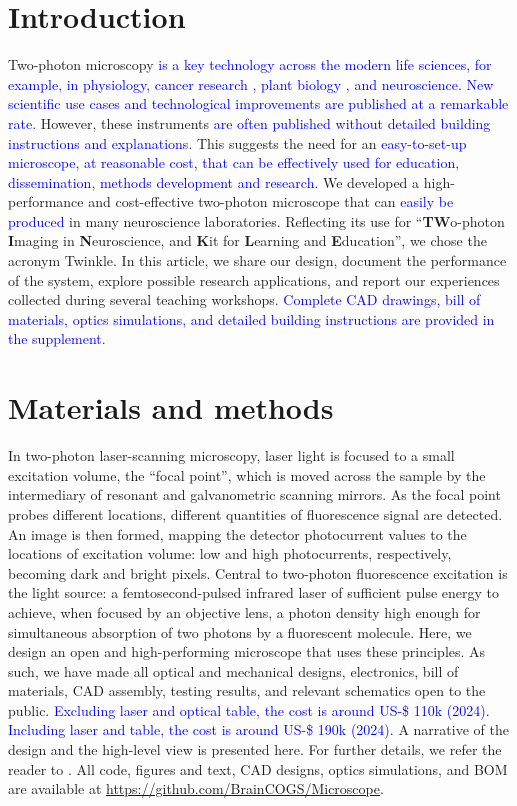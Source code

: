 \documentclass[10pt,letterpaper]{article}
\begin{document}
\linenumbers

\section*{Introduction}
%
Two-photon microscopy\cite{Denk1990, Svoboda1997} \textcolor{blue}{is a key technology across the modern life sciences\cite{Zipfel2003}, for example, in physiology\cite{Ueki2020, Dunn2002}, cancer research \cite{Perry2012}, plant biology \cite{Cheung2010}, and neuroscience\cite{So2000, Helmchen2005}. New scientific use cases and technological improvements are published at a remarkable rate\cite{Luu2024}.} However, these instruments \textcolor{blue}{are often published without detailed building instructions and explanations}. This suggests the need for an \textcolor{blue}{easy-to-set-up microscope, at reasonable cost, that can be effectively used for education, dissemination, methods development and research.} We developed a high-performance and cost-effective two-photon microscope that can \textcolor{blue}{easily be produced} in many neuroscience laboratories. Reflecting its use for ``\textbf{TW}o-photon \textbf{I}maging in \textbf{N}euroscience, and \textbf{K}it for \textbf{L}earning and \textbf{E}ducation'', we chose the acronym Twinkle. In this article, we share our design, document the performance of the system, explore possible research applications, and report our experiences collected during several teaching workshops. \textcolor{blue}{Complete CAD drawings, bill of materials, optics simulations, and detailed building instructions are provided in the supplement.}

\section*{Materials and methods}
In two-photon laser-scanning microscopy\cite{Denk1990}, laser light is focused to a small excitation volume,  the ``focal point'', which is moved across the sample by the intermediary of resonant and galvanometric scanning mirrors. As the focal point probes different locations, different quantities of fluorescence signal are detected.  An image is then formed, mapping the detector photocurrent values to the locations of excitation volume: low and high photocurrents, respectively, becoming dark and bright pixels. Central to two-photon fluorescence excitation is the light source: a femtosecond-pulsed infrared laser of sufficient pulse energy to achieve, when focused by an objective lens, a photon density high enough for simultaneous absorption of two photons by a fluorescent molecule. Here, we design an open and high-performing microscope that uses these principles. As such, we have made all optical and mechanical designs, electronics, bill of materials, CAD assembly, testing results, and relevant schematics open to the public. \textcolor{blue}{Excluding laser and optical table, the cost is around US-\$ 110k (2024). Including laser and table, the cost is around US-\$ 190k (2024).} A narrative of the design and the high-level view is presented here. For further details, we refer the reader to . All code, figures and text, CAD designs, optics simulations, and BOM are available at \url{https://github.com/BrainCOGS/Microscope}.
\end{document}

